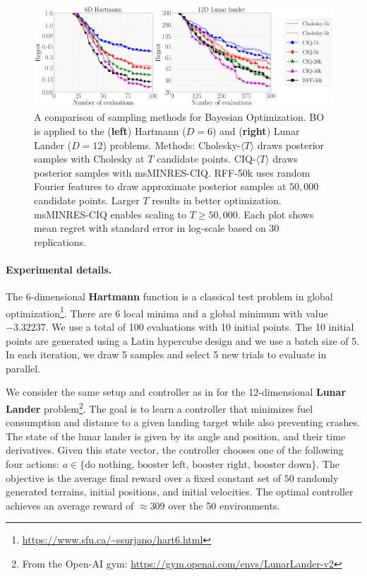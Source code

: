 \begin{figure}[t!]
  \centering
  \includegraphics[width=\linewidth]{figures/bo_ciq.pdf}
  \caption[
    Comparison of msMINRES-CIQ versus sampling methods for Bayesian optimization via Thompson Sampling.
  ]{
    A comparison of sampling methods for Bayesian Optimization.
    BO is applied to the ({\bf left}) Hartmann ($D=6$) and ({\bf right}) Lunar Lander ($D=12$) problems.
    Methods: Cholesky-$\langle T \rangle$ draws posterior samples with Cholesky at $T$ candidate points.
    CIQ-$\langle T \rangle$ draws posterior samples with msMINRES-CIQ.
    RFF-50k uses random Fourier features to draw approximate posterior samples at $50,\!000$ candidate points.
    Larger $T$ results in better optimization.
    msMINRES-CIQ enables scaling to $T \geq 50,\!000$.
    Each plot shows mean regret with standard error in log-scale based on 30 replications.
  }
  \label{fig:bayesopt}
\end{figure}

\paragraph{Experimental details.}
The 6-dimensional {\bf Hartmann} function is a classical test problem in global optimization\footnote{\url{https://www.sfu.ca/~ssurjano/hart6.html}}.
There are 6 local minima and a global minimum with value $-3.32237$.
We use a total of 100 evaluations with 10 initial points.
The 10 initial points are generated using a Latin hypercube design and we use a batch size of 5.
In each iteration, we draw 5 samples and select 5 new trials to evaluate in parallel.

We consider the same setup and controller as in \cite{eriksson2019scalable} for the 12-dimensional {\bf Lunar Lander} problem\footnote{
 From the Open-AI gym: \url{https://gym.openai.com/envs/LunarLander-v2}
}.
The goal is to learn a controller that minimizes fuel consumption and distance to a given landing target while also preventing crashes.
The state of the lunar lander is given by its angle and position, and their time derivatives.
Given this state vector, the controller chooses one of the following four actions: $a \in \{\text{do nothing, booster left, booster right, booster down}\}$.
The objective is the average final reward over a fixed constant set of $50$ randomly generated terrains, initial positions, and initial velocities.
The optimal controller achieves an average reward of $\approx 309$ over the 50 environments.

